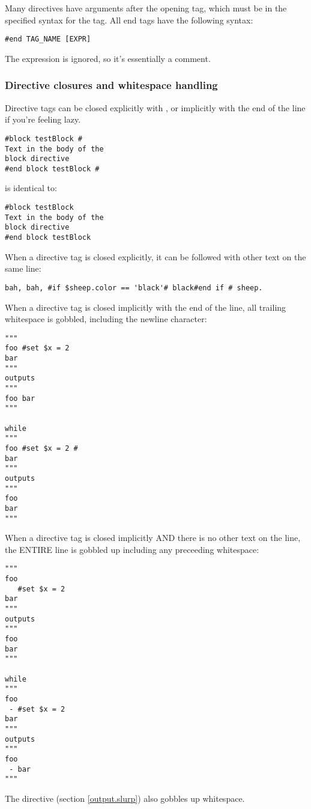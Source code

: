 Many directives have arguments after the opening tag, which must be in the
specified syntax for the tag.  All end tags have the following syntax:
\begin{verbatim}
#end TAG_NAME [EXPR]
\end{verbatim}
The expression is ignored, so it's essentially a comment.  

\subsubsection{Directive closures and whitespace handling}
\label{language.directives.closures}
Directive tags can be closed explicitly with \code{\#}, or implicitly with the
end of the line if you're feeling lazy.

\begin{verbatim}
#block testBlock #
Text in the body of the
block directive
#end block testBlock #
\end{verbatim}
is identical to:
\begin{verbatim}
#block testBlock
Text in the body of the
block directive
#end block testBlock
\end{verbatim}

When a directive tag is closed explicitly, it can be followed with other text on
the same line:

\begin{verbatim}
bah, bah, #if $sheep.color == 'black'# black#end if # sheep.
\end{verbatim}

When a directive tag is closed implicitly with the end of the line, all trailing
whitespace is gobbled, including the newline character:
\begin{verbatim}
"""
foo #set $x = 2 
bar
"""
outputs 
"""
foo bar
"""

while 
"""
foo #set $x = 2 #
bar
"""
outputs 
"""
foo 
bar
"""
\end{verbatim}

When a directive tag is closed implicitly AND there is no other text on the
line, the ENTIRE line is gobbled up including any preceeding whitespace:
\begin{verbatim}
"""
foo 
   #set $x = 2 
bar
"""
outputs 
"""
foo
bar
"""

while 
"""
foo 
 - #set $x = 2
bar
"""
outputs 
"""
foo 
 - bar
"""
\end{verbatim}

The  directive (section \ref{output.slurp}) also gobbles up
whitespace.

